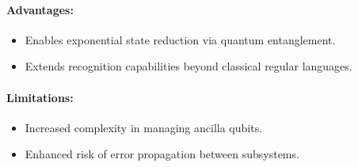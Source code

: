 \paragraph{Advantages:}
\begin{itemize}
    \item Enables exponential state reduction via quantum entanglement.
    \item Extends recognition capabilities beyond classical regular languages.
\end{itemize}

\paragraph{Limitations:}
\begin{itemize}
    \item Increased complexity in managing ancilla qubits.
    \item Enhanced risk of error propagation between subsystems.
\end{itemize}




